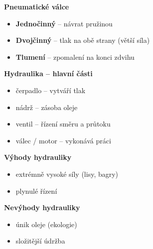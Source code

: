 \documentclass[a4paper,10pt]{article}
\begin{document}
\begin{vysvetlenibox}
\begin{center}
\textbf{Pneumatické válce}
\begin{itemize}[noitemsep, leftmargin=1.4em, topsep=4pt]
    \item \textbf{Jednočinný} -- návrat pružinou
    \item \textbf{Dvojčinný} -- tlak na obě strany (větší síla)
    \item \textbf{Tlumení} -- zpomalení na konci zdvihu
\end{itemize}

\textbf{Hydraulika -- hlavní části}
\begin{itemize}[noitemsep, leftmargin=1.4em, topsep=4pt]
    \item čerpadlo -- vytváří tlak
    \item nádrž -- zásoba oleje
    \item ventil -- řízení směru a průtoku
    \item válec / motor -- vykonává práci
\end{itemize}

\textbf{Výhody hydrauliky}
\begin{itemize}[noitemsep, leftmargin=1.4em, topsep=4pt]
    \item extrémně vysoké síly (lisy, bagry)
    \item plynulé řízení
\end{itemize}

\textbf{Nevýhody hydrauliky}
\begin{itemize}[noitemsep, leftmargin=1.4em, topsep=4pt]
    \item únik oleje (ekologie)
    \item složitější údržba
\end{itemize}

\end{center}
\end{vysvetlenibox}


\end{document}
